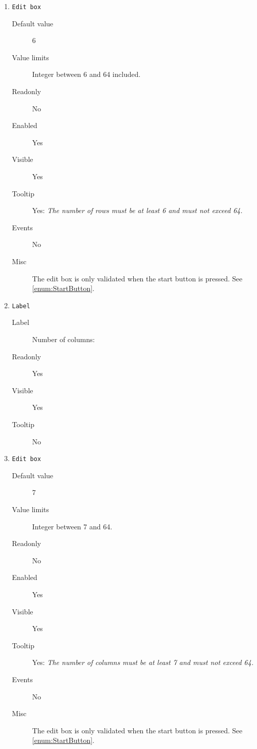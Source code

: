 \begin{enumerate}
    \item \texttt{Edit box} \label{enum:RowEditBox}
              \begin{description}
                  \item[Default value] 6
                  \item[Value limits] Integer between 6 and 64 included.
                  \item[Readonly] No
                  \item[Enabled] Yes
                  \item[Visible] Yes
                  \item[Tooltip] Yes: \textit{The number of rows must be at least 6
                                              and must not exceed 64.}
                  \item[Events] No
                  \item[Misc] The edit box is only validated when the start button is
                              pressed. See \cref{enum:StartButton}.
              \end{description}

    \item \texttt{Label}
              \begin{description}
                  \item[Label] Number of columns:
                  \item[Readonly] Yes
                  \item[Visible] Yes
                  \item[Tooltip] No
              \end{description}

    \item \texttt{Edit box} \label{enum:ColumnEditBox}
              \begin{description}
                  \item[Default value] 7
                  \item[Value limits] Integer between 7 and 64.
                  \item[Readonly] No
                  \item[Enabled] Yes
                  \item[Visible] Yes
                  \item[Tooltip] Yes: \textit{The number of columns must be at least 7
                                              and must not exceed 64.}
                  \item[Events] No
                  \item[Misc] The edit box is only validated when the start button is
                              pressed. See \cref{enum:StartButton}.
              \end{description}


\end{enumerate}
